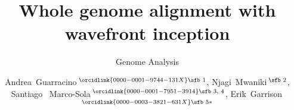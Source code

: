 \documentclass{bioinfo}
\theoremstyle{definition}
\begin{document}

\subtitle{Genome Analysis}

\title[Wavefront inception]{Whole genome alignment with wavefront inception}
\author[Guarracino \textit{et~al}.]{
Andrea~Guarracino\,$^{\orcidlink{0000-0001-9744-131X}\text{\sfb 1}}$,
Njagi~Mwaniki\,$^{\text{\sfb 2}}$,
Santiago~ Marco-Sola\,$^{\orcidlink{0000-0001-7951-3914}\text{\sfb 3, 4}}$,
Erik~Garrison\,$^{\orcidlink{0000-0003-3821-631X}\text{\sfb 5}*}$
}

\address{
$^{\text{\sf 1}}$Genomics Research Centre, Human Technopole, Viale Rita Levi‑Montalcini 1, Milan, 20157, Italy \\
$^{\text{\sf 2}}$Department of Computer Sciences, University of Pisa, Pisa, 56127, Italy \\
$^{\text{\sf 3}}$Department of Computer Sciences, Barcelona Supercomputing Center, Barcelona, 08034, Spain \\
$^{\text{\sf 4}}$Departament d’Arquitectura de Computadors i Sistemes Operatius, Universitat Autònoma de Barcelona, Barcelona, 08193, Spain \\
$^{\text{\sf 5}}$Department of Genetics, Genomics and Informatics, University of Tennessee Health Science Center, Memphis, 38163, Tennessee, USA
}




\end{document}
